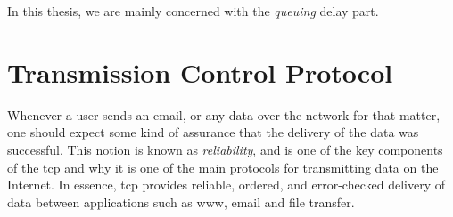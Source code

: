 In this thesis, we are mainly concerned with the \textit{queuing} delay part.




\section{Transmission Control Protocol}

Whenever a user sends an email, or any data over the network for that matter, one should expect some kind of assurance that the delivery of the data was successful. This notion is known as \textit{reliability}, and is one of the key components of the \gls{tcp} and why it is one of the main protocols for transmitting data on the Internet. In essence, \gls{tcp} provides reliable, ordered, and error-checked delivery of data between applications such as \gls{www}, email and file transfer.






